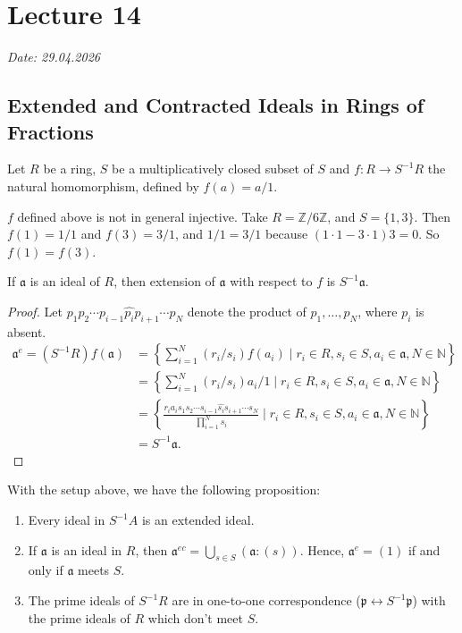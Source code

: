 \chapter{Lecture 14}

\hfill {\footnotesize \emph{Date: 29.04.2026}}
\section{Extended and Contracted Ideals in Rings of Fractions}
Let \( R \) be a ring,  \( S \) be a multiplicatively closed subset of  \( S \) and  \( f: R \to S^{-1}R \) the natural homomorphism, defined by  \( f(a) = a / 1 \). 
\begin{nonexample}
  \( f \) defined above is not in general injective. Take \( R = \mathbb{Z}/6\mathbb{Z} \), and \( S = \{1, 3\} \). Then \( f(1) = 1 / 1 \) and  \( f(3) = 3 / 1 \), and \( 1 / 1 = 3 / 1 \) because  \( (1 \cdot 1 - 3 \cdot 1) 3 = 0 \). So  \( f(1) = f(3) \).
\end{nonexample}
\begin{lemma}\label{lem:extensionOfIdealinRingOfFra}
  If \( \mathfrak{a} \) is an ideal of \( R \), then extension of  \( \mathfrak{a} \) with respect to \( f \) is  \( S^{-1}\mathfrak{a} \).
\end{lemma}
\begin{proof}
  Let \( p_1 p_2 \cdots p_{i-1}\hat{p_i}p_{i+1}\cdots p_N \) denote the product of \( p_1, \ldots, p_N \), where \( p_i \) is absent. 
  \begin{align*}
    \mathfrak{a}^e = (S^{-1}R)f(\mathfrak{a}) &= \left\{\sum_{i=1}^{N} (r_i / s_i) f(a_i) \mid r_i \in R, s_i \in S, a_i \in \mathfrak{a}, N \in \mathbb{N}\right\}\\
                                              &= \left\{\sum_{i=1}^{N} (r_i / s_i) a_i / 1 \mid r_i \in R, s_i \in S, a_i \in \mathfrak{a},  N \in \mathbb{N}\right\}\\
                                              &= \left\{\frac{r_i a_i s_1s_2 \cdots s_{i-1}\hat{s_i} s_{i+1} \cdots s_N}{\prod_{i=1}^N s_i} \mid r_i \in R, s_i \in S, a_i \in \mathfrak{a}, N \in \mathbb{N}\right\}\\
                                              &= S^{-1}\mathfrak{a}
  .\end{align*}
\end{proof}
With the setup above, we have the following proposition:
\begin{proposition}\label{prop:contractextendpropfrac}
  \begin{enumerate}[label=\roman*)]
    \item Every ideal in \( S^{-1}A \) is an extended ideal.
    \item If  \( \mathfrak{a} \) is an ideal in \( R \), then  \( \mathfrak{a}^{ec} = \bigcup_{s \in S}(\mathfrak{a}: (s))\). Hence, \( \mathfrak{a}^e = (1) \) if and only if \( \mathfrak{a} \) meets \( S \). 
    \item The prime ideals of \( S^{-1}R \) are in one-to-one correspondence (\( \mathfrak{p} \leftrightarrow S^{-1}\mathfrak{p} \)) with the prime ideals of \( R \) which don't meet \( S \).
  \end{enumerate}
\end{proposition}
